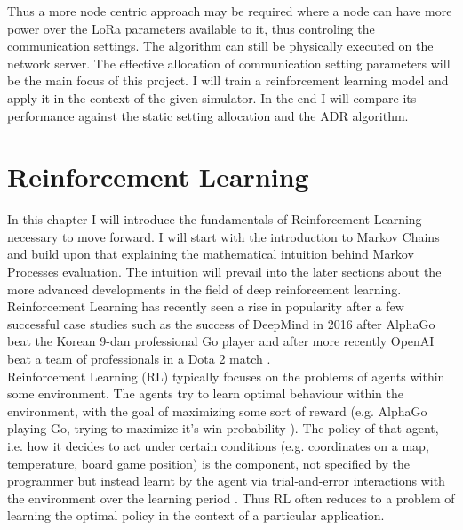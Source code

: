 Thus a more node centric approach may be required 
where a node can have more power over the LoRa parameters
available to it, thus controling the communication settings.
The algorithm can still be physically executed on the
network server. The effective allocation of communication
setting parameters will be the main focus of this project. 
I will train a reinforcement learning model and apply it
in the context of the given simulator. In the end I will
compare its performance against the static setting allocation and the ADR algorithm.




\chapter{Reinforcement Learning} 

In this chapter I will introduce the fundamentals of Reinforcement Learning necessary to move 
forward. I will start with the introduction to Markov Chains
and build upon that explaining the mathematical intuition
behind Markov Processes evaluation. The intuition will prevail 
into the later sections about the more advanced developments in 
the field of deep reinforcement learning.\\

Reinforcement Learning has recently seen a rise in popularity after a few successful case studies such as the success of DeepMind in 2016 after AlphaGo beat the Korean 9-dan professional Go player \cite{alpha_go_lee_sedol} and after more recently OpenAI beat a team of professionals in a Dota 2 match \cite{dota}.\\

Reinforcement Learning (RL) typically focuses on the problems of agents within some environment. The agents try to learn optimal behaviour within the environment, with the goal of maximizing some sort of reward (e.g. AlphaGo playing Go, trying to maximize it's win probability \cite{alpha_go_lee_sedol}). The policy of that agent, i.e. how it decides to act under certain conditions (e.g. coordinates on a map, temperature, board game position) is the component, not specified by the programmer but instead learnt by the agent via trial-and-error interactions with the environment over the learning period \cite{sutton_barto}. Thus RL often reduces to a problem of learning the optimal policy in the context of a particular application.\\

